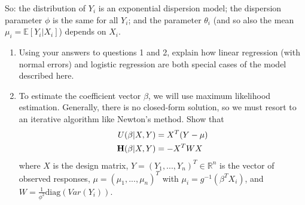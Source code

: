\documentclass[11pt]{article}
\begin{document}
\begin{enumerate}
\noindent So: the distribution of $Y_i$ is an exponential dispersion model; the dispersion parameter $\phi$ is the same for all $Y_i$; and the parameter $\theta_i$ (and so also the mean $\mu_i = \mathbb{E}[Y_i | X_i]$) depends on $X_i$.

\begin{enumerate}
\item Using your answers to questions 1 and 2, explain how linear regression (with normal errors) and logistic regression are both special cases of the model described here.

\item To estimate the coefficient vector $\beta$, we will use maximum likelihood estimation. Generally, there is no closed-form solution, so we must resort to an iterative algorithm like Newton's method. Show that
\begin{align*}
U(\beta | X, Y) &= X^T(Y - \mu) \\
{\bf H}(\beta | X, Y) &= -X^T W X
\end{align*}
where $X$ is the design matrix, $Y = (Y_1,...,Y_n)^T \in \mathbb{R}^n$ is the vector of observed responses, $\mu = (\mu_1,...,\mu_n)^T$ with $\mu_i = g^{-1}(\beta^T X_i)$, and $W = \frac{1}{\phi^2} \text{diag}(Var(Y_i))$.
\end{enumerate}

\end{enumerate}
\end{document}
